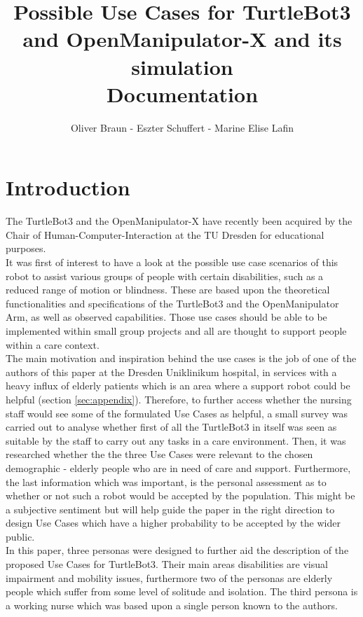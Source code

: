 \documentclass[plainarticle,zihtitle,english,final,hyperref,utf8]{zihpub}
\author{Oliver Braun - Eszter Schuffert - Marine Elise Lafin}
\title{\textbf{Possible Use Cases for TurtleBot3 and OpenManipulator-X and its simulation} \\ \bigskip Documentation}
\begin{document}
\listoftables
\listoffigures
\newpage

\section{Introduction}
The TurtleBot3 and the OpenManipulator-X have recently been acquired by the Chair of Human-Computer-Interaction at the TU Dresden for educational purposes.\\
\newline
It was first of interest to have a look at the possible use case scenarios of this robot to assist various groups of people with certain disabilities, such as a reduced range of motion or blindness. These are based upon the theoretical functionalities and specifications of the TurtleBot3 and the OpenManipulator Arm, as well as observed capabilities. Those use cases should be able to be implemented within small group projects and all are thought to support people within a care context.\\
\newline
The main motivation and inspiration behind the use cases is the job of one of the authors of this paper at the Dresden Uniklinikum hospital, in services with a heavy influx of elderly patients which is an area where a support robot could be helpful (section \ref{sec:appendix}). Therefore, to further access whether the nursing staff would see some of the formulated Use Cases as helpful, a small survey was carried out to analyse whether first of all the TurtleBot3 in itself was seen as suitable by the staff to carry out any tasks in a care environment.
Then, it was researched whether the the three Use Cases were relevant to the chosen demographic - elderly people who are in need of care and support.
Furthermore, the last information which was important, is the personal assessment as to whether or not such a robot would be accepted by the population. This might be a subjective sentiment but will help guide the paper in the right direction to design Use Cases which have a higher probability to be accepted by the wider public.\\
\newline
In this paper, three personas were designed to further aid the description of the proposed Use Cases for TurtleBot3. Their main areas disabilities are visual impairment and mobility issues, furthermore two of the personas are elderly people which suffer from some level of solitude and isolation. The third persona is a working nurse which was based upon a single person known to the authors.\\
\end{document}
